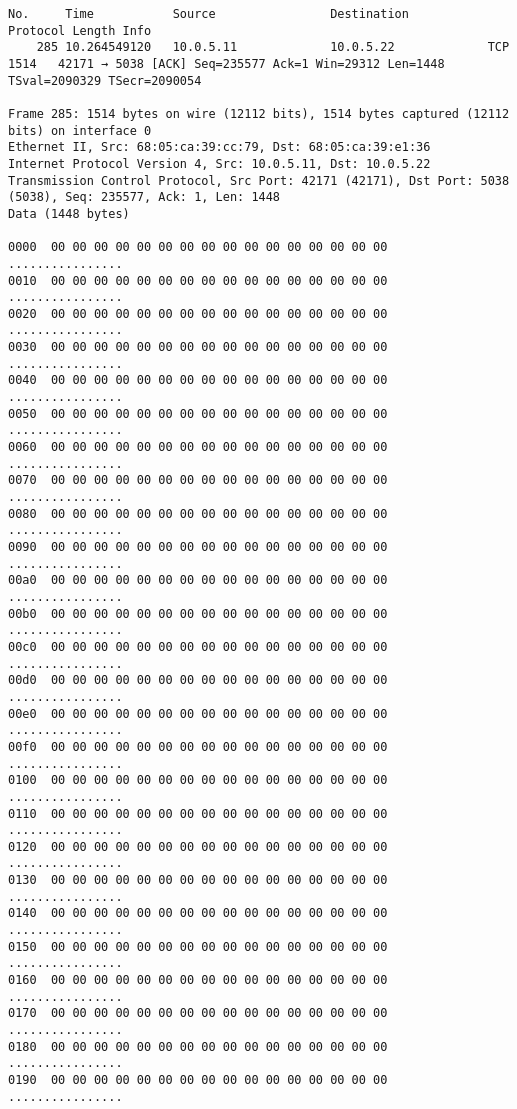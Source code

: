 \begin{lstlisting}
No.     Time           Source                Destination           Protocol Length Info
    285 10.264549120   10.0.5.11             10.0.5.22             TCP      1514   42171 → 5038 [ACK] Seq=235577 Ack=1 Win=29312 Len=1448 TSval=2090329 TSecr=2090054

Frame 285: 1514 bytes on wire (12112 bits), 1514 bytes captured (12112 bits) on interface 0
Ethernet II, Src: 68:05:ca:39:cc:79, Dst: 68:05:ca:39:e1:36
Internet Protocol Version 4, Src: 10.0.5.11, Dst: 10.0.5.22
Transmission Control Protocol, Src Port: 42171 (42171), Dst Port: 5038 (5038), Seq: 235577, Ack: 1, Len: 1448
Data (1448 bytes)

0000  00 00 00 00 00 00 00 00 00 00 00 00 00 00 00 00   ................
0010  00 00 00 00 00 00 00 00 00 00 00 00 00 00 00 00   ................
0020  00 00 00 00 00 00 00 00 00 00 00 00 00 00 00 00   ................
0030  00 00 00 00 00 00 00 00 00 00 00 00 00 00 00 00   ................
0040  00 00 00 00 00 00 00 00 00 00 00 00 00 00 00 00   ................
0050  00 00 00 00 00 00 00 00 00 00 00 00 00 00 00 00   ................
0060  00 00 00 00 00 00 00 00 00 00 00 00 00 00 00 00   ................
0070  00 00 00 00 00 00 00 00 00 00 00 00 00 00 00 00   ................
0080  00 00 00 00 00 00 00 00 00 00 00 00 00 00 00 00   ................
0090  00 00 00 00 00 00 00 00 00 00 00 00 00 00 00 00   ................
00a0  00 00 00 00 00 00 00 00 00 00 00 00 00 00 00 00   ................
00b0  00 00 00 00 00 00 00 00 00 00 00 00 00 00 00 00   ................
00c0  00 00 00 00 00 00 00 00 00 00 00 00 00 00 00 00   ................
00d0  00 00 00 00 00 00 00 00 00 00 00 00 00 00 00 00   ................
00e0  00 00 00 00 00 00 00 00 00 00 00 00 00 00 00 00   ................
00f0  00 00 00 00 00 00 00 00 00 00 00 00 00 00 00 00   ................
0100  00 00 00 00 00 00 00 00 00 00 00 00 00 00 00 00   ................
0110  00 00 00 00 00 00 00 00 00 00 00 00 00 00 00 00   ................
0120  00 00 00 00 00 00 00 00 00 00 00 00 00 00 00 00   ................
0130  00 00 00 00 00 00 00 00 00 00 00 00 00 00 00 00   ................
0140  00 00 00 00 00 00 00 00 00 00 00 00 00 00 00 00   ................
0150  00 00 00 00 00 00 00 00 00 00 00 00 00 00 00 00   ................
0160  00 00 00 00 00 00 00 00 00 00 00 00 00 00 00 00   ................
0170  00 00 00 00 00 00 00 00 00 00 00 00 00 00 00 00   ................
0180  00 00 00 00 00 00 00 00 00 00 00 00 00 00 00 00   ................
0190  00 00 00 00 00 00 00 00 00 00 00 00 00 00 00 00   ................

\end{lstlisting}
